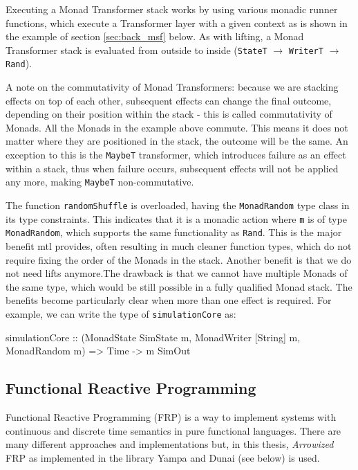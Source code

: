 Executing a Monad Transformer stack works by using various monadic runner functions, which execute a Transformer layer with a given context as is shown in the example of section \ref{sec:back_msf} below. As with lifting, a Monad Transformer stack is evaluated from outside to inside (\texttt{StateT} $\rightarrow$ \texttt{WriterT} $\rightarrow$ \texttt{Rand}).

A note on the commutativity of Monad Transformers: because we are stacking effects on top of each other, subsequent effects can change the final outcome, depending on their position within the stack - this is called commutativity of Monads. All the Monads in the example above commute. This means it does not matter where they are positioned in the stack, the outcome will be the same. An exception to this is the \texttt{MaybeT} transformer, which introduces failure as an effect within a stack, thus when failure occurs, subsequent effects will not be applied any more, making \texttt{MaybeT} non-commutative.

The function \texttt{randomShuffle} is overloaded, having the \texttt{MonadRandom} type class in its type constraints. This indicates that it is a monadic action where \texttt{m} is of type \texttt{MonadRandom}, which supports the same functionality as \texttt{Rand}. This is the major benefit mtl provides, often resulting in much cleaner function types, which do not require fixing the order of the Monads in the stack. Another benefit is that we do not need lifts anymore.The drawback is that we cannot have multiple Monads of the same type, which would be still possible in a fully qualified Monad stack. The benefits become particularly clear when more than one effect is required. For example, we can write the type of \texttt{simulationCore} as:

\begin{HaskellCode}
simulationCore :: (MonadState SimState m, MonadWriter [String] m, MonadRandom m) 
               => Time -> m SimOut
\end{HaskellCode}

\subsection{Functional Reactive Programming}
\label{sec:back_frp}
Functional Reactive Programming (FRP) is a way to implement systems with continuous and discrete time semantics in pure functional languages. There are many different approaches and implementations but, in this thesis, \textit{Arrowized} FRP \cite{hughes_generalising_2000, hughes_programming_2005} as implemented in the library Yampa \cite{courtney_yampa_2003,hudak_arrows_2003,nilsson_functional_2002} and Dunai \cite{perez_functional_2016} (see below) is used.

